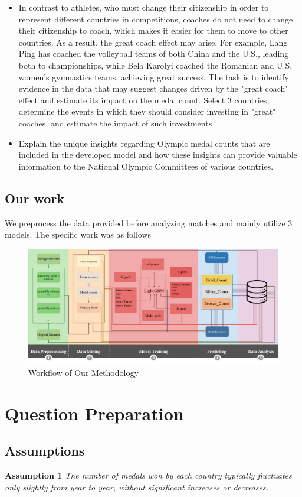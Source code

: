 \documentclass[12pt]{article}  %
\begin{document}
\begin{itemize}
	
	\item In contrast to athletes, who must change their citizenship in order to represent different countries in competitions, coaches do not need to change their citizenship to coach, which makes it easier for them to move to other countries. As a result, the great coach effect may arise. For example, Lang Ping has coached the volleyball teams of both China and the U.S., leading both to championships, while Bela Karolyi coached the Romanian and U.S. women’s gymnastics teams, achieving great success. The task is to identify evidence in the data that may suggest changes driven by the "great coach" effect and estimate its impact on the medal count. Select 3 countries, determine the events in which they should consider investing in "great" coaches, and estimate the impact of such investments
	\item Explain the unique insights regarding Olympic medal counts that are included in the developed model and how these insights can provide valuable information to the National Olympic Committees of various countries.

\end{itemize}

\subsection{Our work}
We preprocess the data provided before analyzing matches and mainly utilize 3 models. The specific work was as follows
\begin{figure}[htbp]
	\centering
	\includegraphics[width=16cm]{img/da.png}
	\caption{Workflow of Our Methodology}
	\label{fig:aa}
\end{figure}


\section{Question Preparation}
\subsection{Assumptions}
\textbf{Assumption 1 } \textit{The number of medals won by each country typically fluctuates only slightly from year to year, without significant increases or decreases.}
\end{document}
